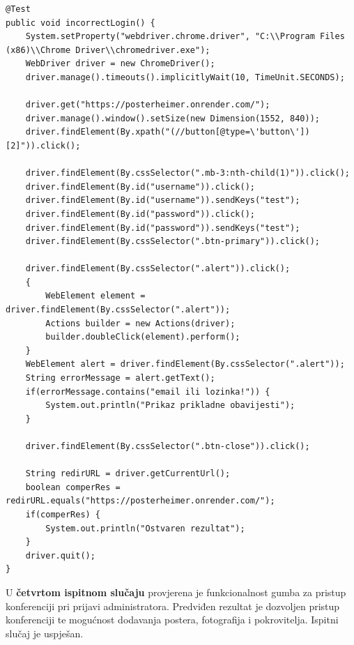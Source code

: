 			\begin{lstlisting}
@Test
public void incorrectLogin() {
	System.setProperty("webdriver.chrome.driver", "C:\\Program Files (x86)\\Chrome Driver\\chromedriver.exe");
	WebDriver driver = new ChromeDriver();
	driver.manage().timeouts().implicitlyWait(10, TimeUnit.SECONDS);
	
	driver.get("https://posterheimer.onrender.com/");
	driver.manage().window().setSize(new Dimension(1552, 840));
	driver.findElement(By.xpath("(//button[@type=\'button\'])[2]")).click();

	driver.findElement(By.cssSelector(".mb-3:nth-child(1)")).click();
	driver.findElement(By.id("username")).click();
	driver.findElement(By.id("username")).sendKeys("test");
	driver.findElement(By.id("password")).click();
	driver.findElement(By.id("password")).sendKeys("test");
	driver.findElement(By.cssSelector(".btn-primary")).click();
	
	driver.findElement(By.cssSelector(".alert")).click();
	{
		WebElement element = driver.findElement(By.cssSelector(".alert"));
		Actions builder = new Actions(driver);
		builder.doubleClick(element).perform();
	}
	WebElement alert = driver.findElement(By.cssSelector(".alert"));
	String errorMessage = alert.getText();
	if(errorMessage.contains("email ili lozinka!")) {
		System.out.println("Prikaz prikladne obavijesti");
	}
	
	driver.findElement(By.cssSelector(".btn-close")).click();
	
	String redirURL = driver.getCurrentUrl();
	boolean comperRes = redirURL.equals("https://posterheimer.onrender.com/");
	if(comperRes) {
		System.out.println("Ostvaren rezultat");
	}
	driver.quit();
}
			\end{lstlisting}
			
			U \textbf{četvrtom ispitnom slučaju} provjerena je funkcionalnost gumba za pristup konferenciji pri prijavi administratora. Predviđen rezultat je dozvoljen pristup konferenciji te mogućnost dodavanja postera, fotografija i pokrovitelja. Ispitni slučaj je uspješan.
			
